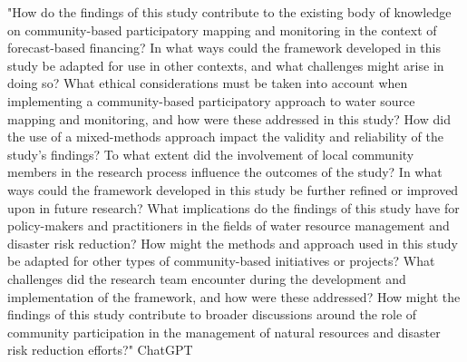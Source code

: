 "How do the findings of this study contribute to the existing body of knowledge on community-based participatory mapping and monitoring in the context of forecast-based financing?
In what ways could the framework developed in this study be adapted for use in other contexts, and what challenges might arise in doing so?
What ethical considerations must be taken into account when implementing a community-based participatory approach to water source mapping and monitoring, and how were these addressed in this study?
How did the use of a mixed-methods approach impact the validity and reliability of the study's findings?
To what extent did the involvement of local community members in the research process influence the outcomes of the study?
In what ways could the framework developed in this study be further refined or improved upon in future research?
What implications do the findings of this study have for policy-makers and practitioners in the fields of water resource management and disaster risk reduction?
How might the methods and approach used in this study be adapted for other types of community-based initiatives or projects?
What challenges did the research team encounter during the development and implementation of the framework, and how were these addressed?
How might the findings of this study contribute to broader discussions around the role of community participation in the management of natural resources and disaster risk reduction efforts?" ChatGPT




